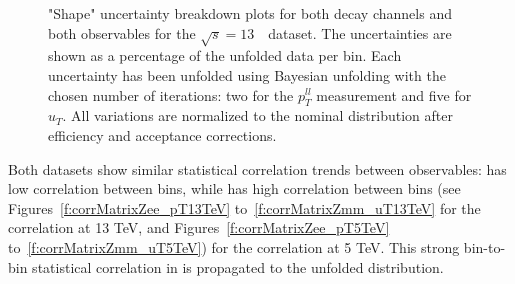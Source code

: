 \begin{figure}[h]
\centering
{}


\caption{"Shape" uncertainty breakdown plots for both \Zboson decay channels and both observables for the $\sqrt{s} = 13$~\TeV\ dataset. The uncertainties are shown as a percentage of the unfolded data per \pT bin. Each uncertainty has been unfolded using Bayesian unfolding with the chosen number of iterations: two for the $p_{T}^{ll}$ measurement and five for $u_{T}$. All variations are normalized to the nominal \pT distribution after efficiency and acceptance corrections.}\end{figure}

Both datasets show similar statistical correlation trends between observables: \ptdilep has low correlation between bins, while \ut has high correlation between bins (see Figures~\ref{f:corrMatrixZee_pT13TeV} to~\ref{f:corrMatrixZmm_uT13TeV} for the correlation at 13 TeV, and Figures~\ref{f:corrMatrixZee_pT5TeV} to~\ref{f:corrMatrixZmm_uT5TeV}) for the correlation at 5 TeV. This strong bin-to-bin statistical correlation in \ut is propagated to the unfolded \ut distribution.


\clearpage